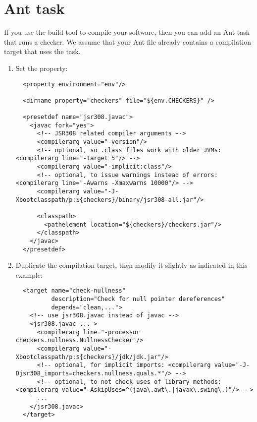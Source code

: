 \section{Ant task\label{ant-task}}

If you use the  build tool to compile
your software, then you can add an Ant task that runs a checker.  We assume
that your Ant file already contains a compilation target that uses the
 task.

\begin{enumerate}
\item
Set the  property:

\begin{smaller}
\begin{Verbatim}
  <property environment="env"/>

  <dirname property="checkers" file="${env.CHECKERS}" />

  <presetdef name="jsr308.javac">
    <javac fork="yes">
      <!-- JSR308 related compiler arguments -->
      <compilerarg value="-version"/>
      <!-- optional, so .class files work with older JVMs: <compilerarg line="-target 5"/> -->
      <compilerarg value="-implicit:class"/>
      <!-- optional, to issue warnings instead of errors: <compilerarg line="-Awarns -Xmaxwarns 10000"/> -->
      <compilerarg value="-J-Xbootclasspath/p:${checkers}/binary/jsr308-all.jar"/>

      <classpath>
        <pathelement location="${checkers}/checkers.jar"/>
      </classpath>
    </javac>
  </presetdef>
\end{Verbatim}
\end{smaller}

\item Duplicate the compilation target, then modify it slightly as
indicated in this example:

\begin{smaller}
\begin{Verbatim}
  <target name="check-nullness"
          description="Check for null pointer dereferences"
          depends="clean,...">
    <!-- use jsr308.javac instead of javac -->
    <jsr308.javac ... >
      <compilerarg line="-processor checkers.nullness.NullnessChecker"/>
      <compilerarg value="-Xbootclasspath/p:${checkers}/jdk/jdk.jar"/>
      <!-- optional, for implicit imports: <compilerarg value="-J-Djsr308_imports=checkers.nullness.quals.*"/> -->
      <!-- optional, to not check uses of library methods: <compilerarg value="-AskipUses=^(java\.awt\.|javax\.swing\.)"/> -->
      ...
    </jsr308.javac>
  </target>
\end{Verbatim}
\end{smaller}


\end{enumerate}
